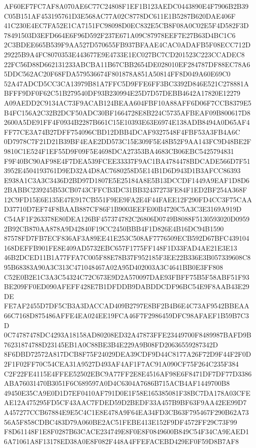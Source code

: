 \documentclass[UTF8,fontset=fandol,zihao=-4,a4paper]{ctexart}
\begin{document}
{{AF60EF7FC7AF8A070AE6C77C24808F1EF1B123AEDC0443890E4F7906B2B39C05B151AF453195761D3E568AC77A02C8778DC611E1B5287B620DAE406F
41C230E4EC7FA52E1CA7151FC98098D0EC832E5CB8F08A0C02E5F4D582F3D78491503D3EFD664E6F96D592F237E671A09C87978EEF7E27B63D4BC1C6
2C3BDEE665B539F9AA527D570655FB937BFAAE4CAC0ADAFB5F08ECC712D29225B9A4FC8070353E443677E9E4733E1EC027BC7CD201523C223CCADEC8
22FC56D88D662131233ABCBA11B67CBB2654DE028010EF284787DF88EC78A65DDC562AC20F68FDA579536674F801878A851A50814FF8D049A60E69C0
52A47ADCD5CC3CA13979B81A7FFC5D9FFE6FF3BC3392D846E521C278881ABFFF9DF0F62C51B279540DF93B230994E25D7D57DEBB4642A17820E12279
A09AEDD2C9134AC73F9ACAB124BEAA604FBF10A88AFF6D06F7CCB8379E5B4FC156A2C32B2DCF50ADC30BF1664728E8B224C5735AFBEAF09B800617D8
2600A5DE91FF4F0934B2287B661C15E10393E63E6974E138ADB8494A0D65AF4FF77CE3A74B27DFF754096CBD12DBB4DCAF9327548F4FBF53A3FB4A6C
0D7978C7F21D21B39BF4EAE2DD573C15E309F5E48B52F9AA143FC9D48BE2F9810C1E524F1EF55D9F09F5E4698DCA27353BA4683CB06EBC5425794831
F9F40BC90AF98E4F7DEA539FCEE33337F9AC1BA4784478BDCADE566D7F513952E4504193761D9ED32A4D8AC7680258D5E14B1D6D943D1B3AFCC86393
E938A1C3A3C3436D2BD97D1807E5E25184A8E5B13DCCDF1449A9EAF1D8D62BABBC239245B53CB0743CFFCB3DC31BB32437273FE84F1ED2BF254A368F
12C9FD15E6E135E47E917CB551F9EE9FA2E4F44FAEE12F290FD4CC3F75CAAD37710D7EF74F8BAAB887CF86F1B9003EEFE00B4720C5A3C3E3169A919D
C54AF1F263378E80DEA126BF457374782C26806D0749B8088F5130593020D09592B92CB870AA878A9D42840F19CC2450BBB4F1D826E4B16DC94B1590
87578FD7FB7ECF836AF3A89EE41E253C508AF7776509ECB592D67BFC439104168DEFFB901FE8E409AD5732EBC657F1775FF148F1D33FAD4AE21E3E13
46B2DCED11B1A77FFA7C005F88E78B37F952185F3EE22B336E3B057339608C895B68383A90A3C313C471048467A02A95D402003A3C4641BB0E3FF808
C52E0B2E1C3A3C54324C72C673E9D2A570097DAE93FBFF75B5F58ABF51F93BE209FF0ED090AFEFF428E7B1DFDDB9DABDDCDF96BC54E9F8AAB43E29DE
FE7AF2455D7DF5CB3A3DACCAD409B2797E8BF2B4B6E4C73AF9542BBEAA66C7168D875486AFFE4EA024EE19FCA46F7F2986459DFC98AFAEF1B59B7C3D
0C74787478DC4293A18158AD80208ED32A47873FFE23449700F8489987BAFD9B76231874788D23145EB1A0C88BE3B4E229A9B08FD20636559287342D
8F6DBD72572A817DCB8F75F24029DEA39CDF9D44C8177A26F72D9F44F2F0D2F1F02FF70C54CEA31A9527D493AF4AF1F7AC91A090CF75F264C235F384
C2F22FE4115E4FFEE52502EBC9A77FF2E8E4516AF98E6F8471DF7DF77D3386ABA76031470B3051F6C689597A0D4C6304A7686B715ACB4AF1449700B8
49450E35CA9E0D1D7EF0410AF791D0E1F58E165385081F38BC7DA178A03CFEAE12A475295FD5CF43AAC7FDED59D2BEDF33A457B9BF63F9AA42EE99D7
A457277CCB67884E9E5C4C1E8E478A9F64EA34FD3CB63F795467F290B62A7356A5F858CDBC483D79A060BE2AC51FEBE413E152F9DF4572FF29C73F99
F8D61148F1E8F0287B63CACE234749E8F0E8F0849600B849C54F34CA9EAED16A71061A8F13178ED38A0E8F082F448A4FFEFACEBD429EF0F59D8B7AF8
}}
\end{document}
